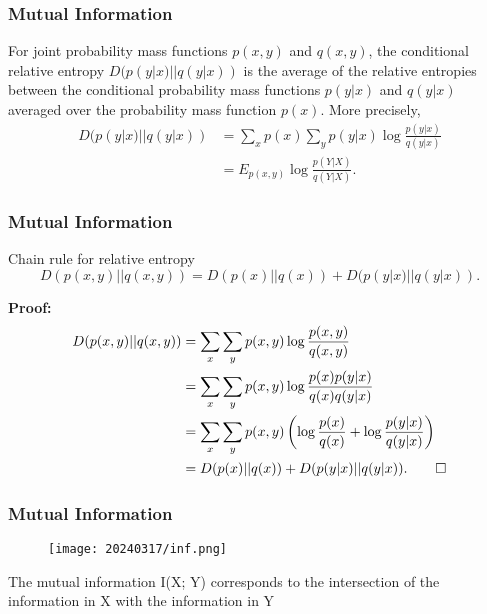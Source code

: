 \documentclass[
	10pt, %
]{beamer}
\begin{document}
\begin{frame}
\frametitle{Mutual Information}
 \begin{definition}
    For joint probability mass functions $p(x, y)$ and $q(x, y)$, the conditional relative entropy $D(p(y|x)||q(y|x))$ is the average of the relative entropies between the conditional probability mass functions $p(y|x)$ and $q(y|x)$ averaged over the probability mass function $p(x)$. More precisely,
    \begin{align*}
        D(p(y|x)||q(y|x)) &= \sum_x p(x) \sum_y p(y|x) \log \frac{p(y|x)}{q(y|x)}  \\
        &= E_{p(x,y)} \log \frac{p(Y|X)}{q(Y|X)}. 
    \end{align*}
    \end{definition}
\end{frame}
\begin{frame}
\frametitle{Mutual Information}
 \begin{definition}
    Chain rule for relative entropy
    \[ D(p(x, y)||q(x, y)) = D(p(x)||q(x)) + D(p(y|x)||q(y|x)). \]
    \end{definition}
 \textbf{Proof:}
    \begin{align*}
        D(p(x, y)||q(x, y)) &= \sum_x \sum_y p(x, y) \log \frac{p(x, y)}{q(x, y)} \\
        &= \sum_x \sum_y p(x, y) \log \frac{p(x)p(y|x)}{q(x)q(y|x)} \\
        &= \sum_x \sum_y p(x, y) \left( \log \frac{p(x)}{q(x)} + \log \frac{p(y|x)}{q(y|x)} \right) \\
        &= D(p(x)||q(x)) + D(p(y|x)||q(y|x)). \qedhere
    \end{align*}
\end{frame}
\begin{frame}
\frametitle{Mutual Information}
\begin{figure}
    \centering
    \texttt{[image: 20240317/inf.png]}
\end{figure}
The mutual information I(X; Y) corresponds to the intersection of the information in X with the information in Y
\end{frame}
\end{document}
